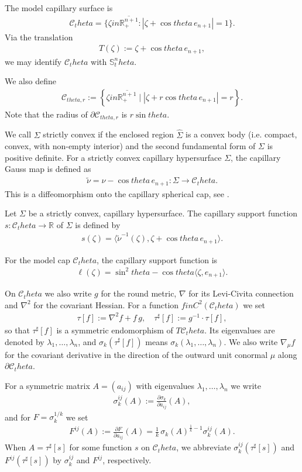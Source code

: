\documentclass[12pt]{amsart}
\def\theta{theta}%
\def\in{in }%
\numberwithin{equation}{section}
\newcommand{\8}{\infty}
\newcommand{\la}{\lambda}
\newcommand{\Si}{\Sigma}
\newcommand{\cC}{\mathcal{C}}
\newcommand{\eq}[1]{\begin{equation}\begin{alignedat}{2}#1\end{alignedat}\end{equation}}
\newcommand{\Cth}{\cC_\theta}
\begin{document}
The model capillary surface is
\eq{
\mathcal{C}_\theta
 = \{\zeta \in \overline{\mathbb{R}^{n+1}_+} : |\zeta + \cos\theta\, e_{n+1}| = 1\}.
}
Via the translation
\eq{
T(\zeta) := \zeta + \cos\theta\,e_{n+1},
}
we may identify \(\mathcal{C}_\theta\) with \(\mathbb{S}^n_\theta\).

We also define
\eq{
\mathcal{C}_{\theta, r} := \left\{ \zeta \in \overline{\mathbb{R}_+^{n+1}} \mid |\zeta + r \cos \theta\, e_{n+1}| = r \right\}.
}
Note that the radius of $\partial \mathcal{C}_{\theta, r}$ is $r\sin\theta$.

We call $\Si$ strictly convex if the enclosed region $\widehat\Si$ is a convex body (i.e. compact, convex, with non-empty interior) and the second fundamental form of $\Si$ is positive definite. For a strictly convex capillary hypersurface $\Sigma$, the capillary Gauss map is defined as
\eq{
\tilde{\nu} = \nu - \cos\theta\, e_{n+1}: \Sigma \to\Cth.
}
This is a diffeomorphism onto the capillary spherical cap, see \cite[Lem. 2.2]{MWWX25}.

\begin{defn}
Let $\Si$ be a strictly convex, capillary hypersurface. The capillary support function $s:\Cth \to \mathbb{R}$ of $\Sigma$ is defined by
\eq{
s(\zeta) = \langle \tilde{\nu}^{-1}(\zeta), \zeta + \cos\theta\, e_{n+1} \rangle.
}
\end{defn}

For the model cap $\mathcal{C}_\theta$, the capillary support function is
\eq{
\ell(\zeta) = \sin^2\theta - \cos\theta\langle \zeta, e_{n+1} \rangle.
}

On $\Cth$ we also write $g$ for the round metric, $\nabla$ for its
Levi-Civita connection and $\nabla^2$ for the covariant Hessian.
For a function $f\in C^2(\Cth)$ we set
\eq{
  \tau[f]:=\nabla^2 f+f\,g,\quad
  \tau^\sharp[f]:=g^{-1}\cdot\tau[f],
}
so that $\tau^\sharp[f]$ is a symmetric endomorphism of $T\Cth$. Its
eigenvalues are denoted by $\la_1,\dots,\la_n$, and
$\sigma_k(\tau^\sharp[f])$ means $\sigma_k(\la_1,\dots,\la_n)$.
We also write $\nabla_\mu f$ for the covariant derivative in the
direction of the outward unit conormal $\mu$ along $\partial\Cth$.


For a symmetric matrix $A=(a_{ij})$ with eigenvalues
$\la_1,\dots,\la_n$ we write
\eq{
  \sigma_k^{ij}(A):=\frac{\partial\sigma_k}{\partial a_{ij}}(A),
}
and for $F=\sigma_k^{1/k}$ we set
\eq{
  F^{ij}(A):=\frac{\partial F}{\partial a_{ij}}(A)
           =\frac1k\,\sigma_k(A)^{\frac{1}{k}-1}\sigma_k^{ij}(A).
}
When $A=\tau^\sharp[s]$ for some function $s$ on $\Cth$, we abbreviate
$\sigma_k^{ij}(\tau^\sharp[s])$ and $F^{ij}(\tau^\sharp[s])$ by
$\sigma_k^{ij}$ and $F^{ij}$, respectively.
\end{document}
